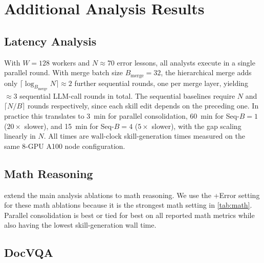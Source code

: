 \section{Additional Analysis Results}
\label{app:parallel_consolidation_details}

\subsection{Latency Analysis}
\label{app:parallel_latency}

With $W{=}128$ workers and $N{\approx}70$ error lessons, all analysts execute in a single parallel round.
With merge batch size $B_\text{merge}{=}32$, the hierarchical merge adds only $\lceil\log_{B_\text{merge}} N\rceil{\approx}2$ further sequential rounds, one per merge layer, yielding ${\approx}3$ sequential LLM-call rounds in total.
The sequential baselines require $N$ and $\lceil N/B\rceil$ rounds respectively, since each skill edit depends on the preceding one.
In practice this translates to 3~min for parallel consolidation, 60~min for Seq-$B{=}1$ ($20{\times}$ slower), and 15~min for Seq-$B{=}4$ ($5{\times}$ slower), with the gap scaling linearly in $N$.
All times are wall-clock skill-generation times measured on the same 8-GPU A100 node configuration.

\subsection{Math Reasoning}
\label{app:math_ablations}

 extend the main analysis ablations to math reasoning.
We use the +Error setting for these math ablations because it is the strongest math setting in \cref{tab:math}.
Parallel consolidation is best or tied for best on all reported math metrics while also having the lowest skill-generation wall time.

\begin{table}[t]
\begin{minipage}[t]{0.49\linewidth}

\end{minipage}\hfill
\begin{minipage}[t]{0.49\linewidth}

\end{minipage}
\end{table}

\subsection{DocVQA}
\label{app:vqa_ablations}

